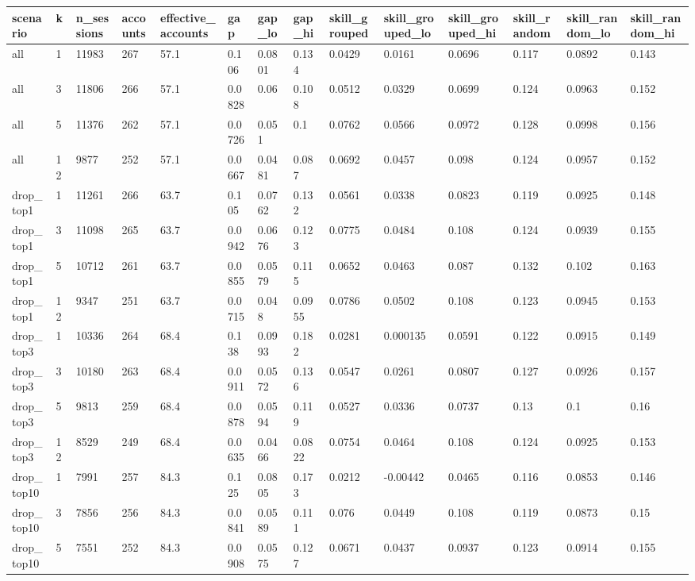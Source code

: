\begin{tabular}{llllllllllllll}
\toprule
scenario & k & n\_sessions & accounts & effective\_accounts & gap & gap\_lo & gap\_hi & skill\_grouped & skill\_grouped\_lo & skill\_grouped\_hi & skill\_random & skill\_random\_lo & skill\_random\_hi \\
\midrule
all & 1 & 11983 & 267 & 57.1 & 0.106 & 0.0801 & 0.134 & 0.0429 & 0.0161 & 0.0696 & 0.117 & 0.0892 & 0.143 \\
all & 3 & 11806 & 266 & 57.1 & 0.0828 & 0.06 & 0.108 & 0.0512 & 0.0329 & 0.0699 & 0.124 & 0.0963 & 0.152 \\
all & 5 & 11376 & 262 & 57.1 & 0.0726 & 0.051 & 0.1 & 0.0762 & 0.0566 & 0.0972 & 0.128 & 0.0998 & 0.156 \\
all & 12 & 9877 & 252 & 57.1 & 0.0667 & 0.0481 & 0.087 & 0.0692 & 0.0457 & 0.098 & 0.124 & 0.0957 & 0.152 \\
drop\_top1 & 1 & 11261 & 266 & 63.7 & 0.105 & 0.0762 & 0.132 & 0.0561 & 0.0338 & 0.0823 & 0.119 & 0.0925 & 0.148 \\
drop\_top1 & 3 & 11098 & 265 & 63.7 & 0.0942 & 0.0676 & 0.123 & 0.0775 & 0.0484 & 0.108 & 0.124 & 0.0939 & 0.155 \\
drop\_top1 & 5 & 10712 & 261 & 63.7 & 0.0855 & 0.0579 & 0.115 & 0.0652 & 0.0463 & 0.087 & 0.132 & 0.102 & 0.163 \\
drop\_top1 & 12 & 9347 & 251 & 63.7 & 0.0715 & 0.048 & 0.0955 & 0.0786 & 0.0502 & 0.108 & 0.123 & 0.0945 & 0.153 \\
drop\_top3 & 1 & 10336 & 264 & 68.4 & 0.138 & 0.0993 & 0.182 & 0.0281 & 0.000135 & 0.0591 & 0.122 & 0.0915 & 0.149 \\
drop\_top3 & 3 & 10180 & 263 & 68.4 & 0.0911 & 0.0572 & 0.136 & 0.0547 & 0.0261 & 0.0807 & 0.127 & 0.0926 & 0.157 \\
drop\_top3 & 5 & 9813 & 259 & 68.4 & 0.0878 & 0.0594 & 0.119 & 0.0527 & 0.0336 & 0.0737 & 0.13 & 0.1 & 0.16 \\
drop\_top3 & 12 & 8529 & 249 & 68.4 & 0.0635 & 0.0466 & 0.0822 & 0.0754 & 0.0464 & 0.108 & 0.124 & 0.0925 & 0.153 \\
drop\_top10 & 1 & 7991 & 257 & 84.3 & 0.125 & 0.0805 & 0.173 & 0.0212 & -0.00442 & 0.0465 & 0.116 & 0.0853 & 0.146 \\
drop\_top10 & 3 & 7856 & 256 & 84.3 & 0.0841 & 0.0589 & 0.111 & 0.076 & 0.0449 & 0.108 & 0.119 & 0.0873 & 0.15 \\
drop\_top10 & 5 & 7551 & 252 & 84.3 & 0.0908 & 0.0575 & 0.127 & 0.0671 & 0.0437 & 0.0937 & 0.123 & 0.0914 & 0.155 \\

\end{tabular}
